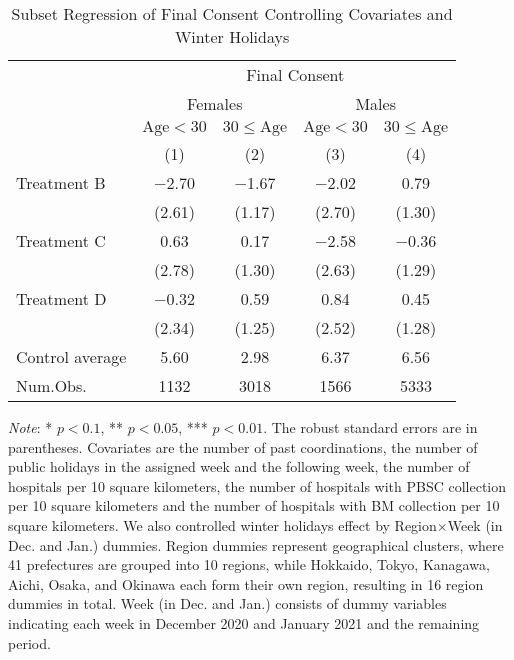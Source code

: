 \documentclass[12pt, a4paper]{article}
\begin{document}
\begin{table}[H]

\caption{\label{tab:consent-lm-subset3}Subset Regression of Final Consent Controlling Covariates and Winter Holidays}
\centering
\fontsize{8}{10}\selectfont
\begin{threeparttable}
\begin{tabular}[t]{lcccc}
\toprule
\multicolumn{1}{c}{ } & \multicolumn{4}{c}{Final Consent} \\
\cmidrule(l{3pt}r{3pt}){2-5}
\multicolumn{1}{c}{ } & \multicolumn{2}{c}{Females} & \multicolumn{2}{c}{Males} \\
\cmidrule(l{3pt}r{3pt}){2-3} \cmidrule(l{3pt}r{3pt}){4-5}
\multicolumn{1}{c}{ } & \multicolumn{1}{c}{$\text{Age} < 30$} & \multicolumn{1}{c}{$30 \le \text{Age}$} & \multicolumn{1}{c}{$\text{Age} < 30$} & \multicolumn{1}{c}{$30 \le \text{Age}$} \\
\cmidrule(l{3pt}r{3pt}){2-2} \cmidrule(l{3pt}r{3pt}){3-3} \cmidrule(l{3pt}r{3pt}){4-4} \cmidrule(l{3pt}r{3pt}){5-5}
  & (1) & (2) & (3) & (4)\\
\midrule
Treatment B & \num{-2.70} & \num{-1.67} & \num{-2.02} & \num{0.79}\\
 & (\num{2.61}) & (\num{1.17}) & (\num{2.70}) & (\num{1.30})\\
Treatment C & \num{0.63} & \num{0.17} & \num{-2.58} & \num{-0.36}\\
 & (\num{2.78}) & (\num{1.30}) & (\num{2.63}) & (\num{1.29})\\
Treatment D & \num{-0.32} & \num{0.59} & \num{0.84} & \num{0.45}\\
 & (\num{2.34}) & (\num{1.25}) & (\num{2.52}) & (\num{1.28})\\
\midrule
Control average & 5.60 & 2.98 & 6.37 & 6.56\\
Num.Obs. & \num{1132} & \num{3018} & \num{1566} & \num{5333}\\
\bottomrule
\end{tabular}
\begin{tablenotes}
\item \emph{Note}: * $p < 0.1$, ** $p < 0.05$, *** $p < 0.01$. The robust standard errors are in parentheses. Covariates are the number of past coordinations, the number of public holidays in the assigned week and the following week, the number of hospitals per 10 square kilometers, the number of hospitals with PBSC collection per 10 square kilometers and the number of hospitals with BM collection per 10 square kilometers. We also controlled winter holidays effect by Region$\times$Week (in Dec. and Jan.) dummies. Region dummies represent geographical clusters, where 41 prefectures are grouped into 10 regions, while Hokkaido, Tokyo, Kanagawa, Aichi, Osaka, and Okinawa each form their own region, resulting in 16 region dummies in total. Week (in Dec. and Jan.) consists of dummy variables indicating each week in December 2020 and January 2021 and the remaining period.
\end{tablenotes}
\end{threeparttable}
\end{table}
\end{document}
